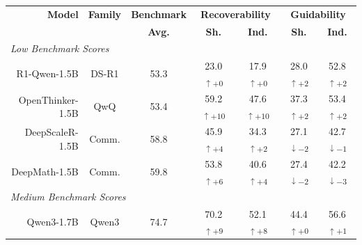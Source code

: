 \documentclass{article} %
\begin{document}
\begin{table}[t]
  \centering
  \small
  \begin{tabular}{r|c|c|cc|cc}
    \toprule
    \textbf{Model} &
    \textbf{Family} &
    \multicolumn{1}{c|}{\textbf{Benchmark}} & 
    \multicolumn{2}{c|}{\textbf{Recoverability}} &
    \multicolumn{2}{c}{\textbf{Guidability}} \\
    &  & \multicolumn{1}{c|}{\textbf{Avg.}} &
    \textbf{Sh.} & \textbf{Ind.} & \textbf{Sh.} & \textbf{Ind.} \\
    \midrule
    \multicolumn{7}{l}{\textit{Low Benchmark Scores}} \\
    \midrule

    R1-Qwen-1.5B      & DS-R1 & 53.3 &
    \cellcolor{green!0}23.0\textsubscript{$\uparrow+0$} &
    \cellcolor{green!0}17.9\textsubscript{$\uparrow+0$} &
    \cellcolor{green!12}28.0\textsubscript{$\uparrow+2$} &
    \cellcolor{green!12}52.8\textsubscript{$\uparrow+2$} \\

    OpenThinker-1.5B  & QwQ   & 53.4 &
    \cellcolor{green!33}59.2\textsubscript{$\uparrow+10$} &
    \cellcolor{green!33}47.6\textsubscript{$\uparrow+10$} &
    \cellcolor{green!12}37.3\textsubscript{$\uparrow+2$} &
    \cellcolor{green!12}53.4\textsubscript{$\uparrow+2$} \\

    DeepScaleR-1.5B   & Comm. & 58.8 &
    \cellcolor{green!15}45.9\textsubscript{$\uparrow+4$} &
    \cellcolor{green!12}34.3\textsubscript{$\uparrow+2$} &
    \cellcolor{red!12}27.1\textsubscript{$\downarrow-2$} &
    \cellcolor{red!11}42.7\textsubscript{$\downarrow-1$} \\

    DeepMath-1.5B     & Comm. & 59.8 &
    \cellcolor{green!16}53.8\textsubscript{$\uparrow+6$} &
    \cellcolor{green!15}40.6\textsubscript{$\uparrow+4$} &
    \cellcolor{red!12}27.4\textsubscript{$\downarrow-2$} &
    \cellcolor{red!13}42.2\textsubscript{$\downarrow-3$} \\

    \midrule
    \multicolumn{7}{l}{\textit{Medium Benchmark Scores}} \\
    \midrule

    Qwen3-1.7B        & Qwen3 & 74.7 &
    \cellcolor{green!29}70.2\textsubscript{$\uparrow+9$} &
    \cellcolor{green!28}52.1\textsubscript{$\uparrow+8$} &
    \cellcolor{green!0}44.4\textsubscript{$\uparrow+0$} &
    \cellcolor{green!11}56.6\textsubscript{$\uparrow+1$} \\


\end{tabular}
\end{table}
\end{document}
